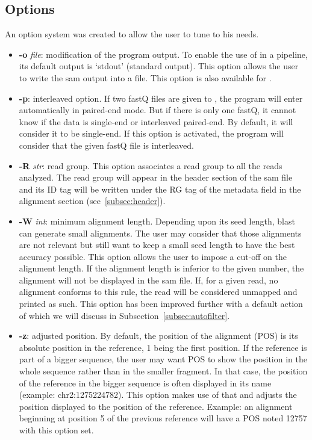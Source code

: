 \subsection{Options}\label{subsec:options}
An option system was created to allow the user to tune \blastobam{} to his needs.
\begin{itemize}
    \item \textbf{-o} \emph{file}: modification of the program output.
    To enable the use of \blastobam{} in a pipeline, its default output is `stdout' (standard output).
    This option allows the user to write the \gls{sam} output into a file.
    This option is also available for \fastqtofasta{}.
    \item \textbf{-p}: interleaved option.
    If two fastQ files are given to \blastobam{}, the program will enter automatically in paired-end mode.
    But if there is only one fastQ, it cannot know if the data is single-end or interleaved paired-end. By default, it will consider it to be single-end.
    If this option is activated, the program will consider that the given fastQ file is interleaved.
    \item \textbf{-R} \emph{str}: read group. This option associates a read group to all the reads analyzed.
    The read group will appear in the header section of the \gls{sam} file and its ID tag will be written under the RG tag of the metadata field in the alignment section (see~\ref{subsec:header}).
    \item \textbf{-W} \emph{int}: minimum alignment length.
    Depending upon its seed length, \gls{blast} can generate small alignments.
    The user may consider that those alignments are not relevant but still want to keep a small seed length to have the best accuracy possible.
    This option allows the user to impose a cut-off on the alignment length.
    If the alignment length is inferior to the given number, the alignment will not be displayed in the \gls{sam} file.
    If, for a given read, no alignment conforms to this rule, the read will be considered unmapped and printed as such.
    This option has been improved further with a default action of which we will discuss in Subsection~\ref{subsec:autofilter}.
    \item \textbf{-z}: adjusted position.
    By default, the position of the alignment (POS) is its absolute position in the reference, 1 being the first position.
    If the reference is part of a bigger sequence, the user may want POS to show the position in the whole sequence rather than in the smaller fragment.
    In that case, the position of the reference in the bigger sequence is often displayed in its name (example: chr2:12752\textendash{}24782).
    This option makes use of that and adjusts the position displayed to the position of the reference.
    Example: an alignment beginning at position 5 of the previous reference will have a POS noted 12757 with this option set.
\end{itemize}


